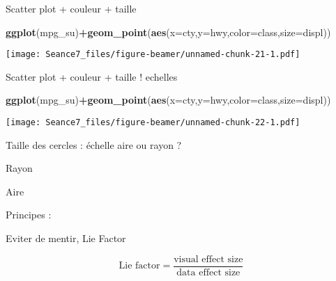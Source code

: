 \documentclass[ignorenonframetext,]{beamer}
\newenvironment{Shaded}{\begin{snugshade}}{\end{snugshade}}
\newcommand{\DataTypeTok}[1]{\textcolor[rgb]{0.13,0.29,0.53}{#1}}
\newcommand{\KeywordTok}[1]{\textcolor[rgb]{0.13,0.29,0.53}{\textbf{#1}}}
\newcommand{\NormalTok}[1]{#1}
\newcommand{\OperatorTok}[1]{\textcolor[rgb]{0.81,0.36,0.00}{\textbf{#1}}}
\begin{document}
\begin{frame}[fragile]{Scatter plot + couleur + taille}
\protect\hypertarget{scatter-plot-couleur-taille}{}

\begin{Shaded}
\begin{Highlighting}[]
\KeywordTok{ggplot}\NormalTok{(mpg_su)}\OperatorTok{+}\KeywordTok{geom_point}\NormalTok{(}\KeywordTok{aes}\NormalTok{(}\DataTypeTok{x=}\NormalTok{cty,}\DataTypeTok{y=}\NormalTok{hwy,}\DataTypeTok{color=}\NormalTok{class,}\DataTypeTok{size=}\NormalTok{displ))}
\end{Highlighting}
\end{Shaded}

\texttt{[image: Seance7\_files/figure-beamer/unnamed-chunk-21-1.pdf]}

\end{frame}

\begin{frame}[fragile]{Scatter plot + couleur + taille ! echelles}
\protect\hypertarget{scatter-plot-couleur-taille-echelles}{}

\begin{Shaded}
\begin{Highlighting}[]
\KeywordTok{ggplot}\NormalTok{(mpg_su)}\OperatorTok{+}\KeywordTok{geom_point}\NormalTok{(}\KeywordTok{aes}\NormalTok{(}\DataTypeTok{x=}\NormalTok{cty,}\DataTypeTok{y=}\NormalTok{hwy,}\DataTypeTok{color=}\NormalTok{class,}\DataTypeTok{size=}\NormalTok{displ))}
\end{Highlighting}
\end{Shaded}

\texttt{[image: Seance7\_files/figure-beamer/unnamed-chunk-22-1.pdf]}

\end{frame}

\begin{frame}{}
\protect\hypertarget{section-13}{}

Taille des cercles : échelle aire ou rayon ?

Rayon

Aire

\end{frame}

\begin{frame}{}
\protect\hypertarget{section-14}{}

\end{frame}

\begin{frame}{}
\protect\hypertarget{section-15}{}

Principes :

Eviter de mentir, Lie Factor

\[\textrm{Lie factor} = \frac{\textrm{visual effect size}}{\textrm{data effect size}}\]

\end{frame}
\end{document}
